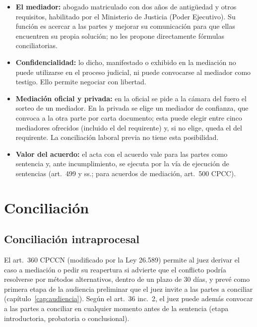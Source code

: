 \documentclass[12pt,oneside]{book}
\begin{document}
\begin{itemize}
\item \textbf{El mediador:} abogado matriculado con dos años de antigüedad y otros requisitos, habilitado por el Ministerio de Justicia (Poder Ejecutivo). Su función es acercar a las partes y mejorar su comunicación para que ellas encuentren su propia solución; no les propone directamente fórmulas conciliatorias.
\item \textbf{Confidencialidad:} lo dicho, manifestado o exhibido en la mediación no puede utilizarse en el proceso judicial, ni puede convocarse al mediador como testigo. Ello permite negociar con libertad.
\item \textbf{Mediación oficial y privada:} en la oficial se pide a la cámara del fuero el sorteo de un mediador. En la privada se elige un mediador de confianza, que convoca a la otra parte por carta documento; esta puede elegir entre cinco mediadores ofrecidos (incluido el del requirente) y, si no elige, queda el del requirente. La conciliación laboral previa no tiene esta posibilidad.
\item \textbf{Valor del acuerdo:} el acta con el acuerdo vale para las partes como sentencia y, ante incumplimiento, se ejecuta por la vía de ejecución de sentencias (art.~499 y ss.; para acuerdos de mediación, art.~500 CPCC).
\end{itemize}

\section{Conciliación}

\subsection{Conciliación intraprocesal}

El art.~360 CPCCN (modificado por la Ley 26.589) permite al juez derivar el caso a mediación o pedir su reapertura si advierte que el conflicto podría resolverse por métodos alternativos, dentro de un plazo de 30 días, y prevé como primera etapa de la audiencia preliminar que el juez invite a las partes a conciliar (capítulo~\ref{cap:audiencia}). Según el art.~36 inc.~2, el juez puede además convocar a las partes a conciliar en cualquier momento antes de la sentencia (etapa introductoria, probatoria o conclusional).
\end{document}
